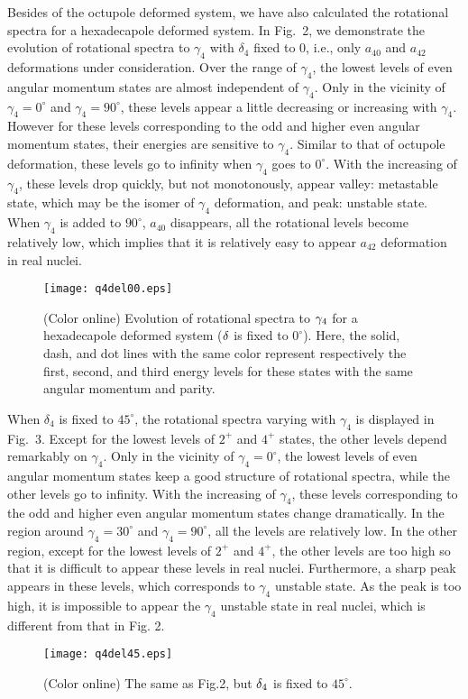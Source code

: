 \documentclass[twocolumn,prc,showpacs,preprintnumbers,superscriptaddress,floatfix]{revtex4}
\begin{document}
Besides of the octupole deformed system, we have also calculated the
rotational spectra for a hexadecapole deformed system. In Fig.~2, we
demonstrate the evolution of rotational spectra to $\gamma _{4} $ with $%
\delta _{4}$ fixed to $0$, i.e., only $a_{40}$ and $a_{42}$ deformations
under consideration. Over the range of $\gamma _{4}$, the lowest levels of
even angular momentum states are almost independent of $\gamma _{4}$. Only
in the vicinity of $\gamma _{4}=0^{\circ }$ and $\gamma _{4}=90^{\circ }$,
these levels appear a little decreasing or increasing with $\gamma _{4}$.
However for these levels corresponding to the odd and higher even angular
momentum states, their energies are sensitive to $\gamma _{4}$. Similar to
that of octupole deformation, these levels go to infinity when $\gamma _{4}$
goes to $0^{\circ }$. With the increasing of $\gamma _{4}$, these levels
drop quickly, but not monotonously, appear valley: metastable state, which
may be the isomer of $\gamma _{4}$ deformation, and peak: unstable state.
When $\gamma _{4}$ is added to $90^{\circ }$, $a_{40}$ disappears, all the
rotational levels become relatively low, which implies that it is relatively
easy to appear $a_{42}$ deformation in real nuclei.
\begin{figure}[tbp]
\texttt{[image: q4del00.eps]}
\caption{(Color online) Evolution of rotational spectra to $\protect\gamma %
_{4}$ for a hexadecapole deformed system ($\protect\delta $ is fixed to $%
0^{\circ }$). Here, the solid, dash, and dot lines with the same color
represent respectively the first, second, and third energy levels for these
states with the same angular momentum and parity.}
\end{figure}

When $\delta _{4}$ is fixed to $45^{\circ }$, the rotational spectra varying
with $\gamma _{4}$ is displayed in Fig.~3. Except for the lowest levels of $%
2^{+}$ and $4^{+}$ states, the other levels depend remarkably on $\gamma
_{4} $. Only in the vicinity of $\gamma _{4}=0^{\circ }$, the lowest levels
of even angular momentum states keep a good structure of rotational spectra,
while the other levels go to infinity. With the increasing of $\gamma _{4}$,
these levels corresponding to the odd and higher even angular momentum
states change dramatically. In the region around $\gamma _{4}=30^{\circ }$
and $\gamma _{4}=90^{\circ }$, all the levels are relatively low. In the
other region, except for the lowest levels of $2^{+}$ and $4^{+}$, the other
levels are too high so that it is difficult to appear these levels in real
nuclei. Furthermore, a sharp peak appears in these levels, which corresponds
to $\gamma _{4}$ unstable state. As the peak is too high, it is impossible
to appear the $\gamma _{4}$ unstable state in real nuclei, which is
different from that in Fig. 2.
\begin{figure}[tbp]
\texttt{[image: q4del45.eps]}
\caption{(Color online) The same as Fig.2, but $\protect\delta_4 $ is fixed
to $45^{\circ }$.}
\end{figure}
\end{document}
